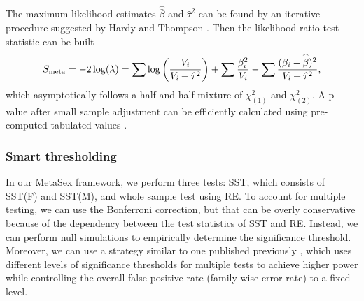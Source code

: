 \documentclass[11pt]{article}
\begin{document}
The maximum likelihood estimates $\widehat{\bar{\beta}}$ and $\hat{\tau}^2$ can be 
found by an iterative procedure suggested by 
Hardy and Thompson \citep{Hardy96}.
Then the likelihood ratio test statistic can be built
\begin{equation}
\label{eq:newRE}
S_{\rm meta} = -2\log(\lambda) 
= \sum \log \left( \frac{V_i}{V_i+\hat{\tau}^2}\right)
+ \sum \frac{\beta_i^2}{V_i} - \sum \frac{(\beta_i-\widehat{\bar{\beta}})^2}{V_i+\hat{\tau}^2},
\end{equation}
which asymptotically follows a half and half mixture of $\chi^2_{(1)}$ and $\chi^2_{(2)}$.
A p-value after small sample adjustment can be efficiently calculated using pre-computed tabulated values \citep{Han:AmJHumGenet:2011}.

\subsubsection*{Smart thresholding}

In our MetaSex framework, we perform three tests: SST, which consists of SST(F) and SST(M), and whole sample test using RE.
To account for multiple testing, we can use the Bonferroni correction, but that can be overly conservative
because of the dependency between the test statistics of SST and RE.
Instead, we can perform null simulations to empirically determine the significance threshold.
Moreover, we can use a strategy similar to one published previously \citep{Eskin:GenomeRes:2008}, 
which uses different levels of significance thresholds for multiple tests to achieve higher power while
controlling the overall 
false positive rate (family-wise error rate) to a fixed level.
\end{document}
